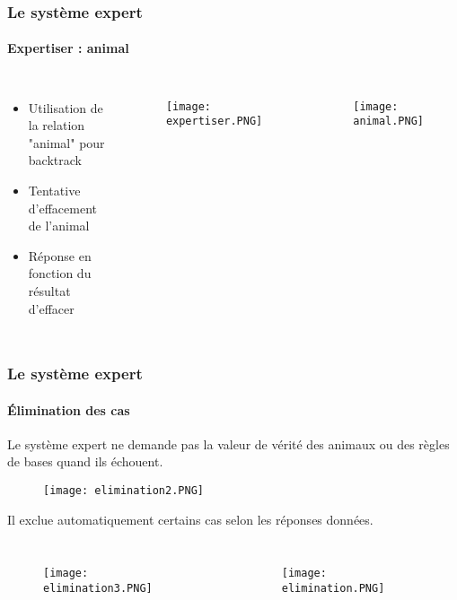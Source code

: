\documentclass[10pt]{beamer}
\begin{document}
\begin{frame}
	\frametitle{\textbf {\Large Le système expert}}
	\framesubtitle{\large Expertiser : animal}
	
	\begin{columns}
			\begin{itemize}
				\item Utilisation de la relation "animal" pour backtrack
				\smallskip
				\item Tentative d'effacement de l'animal 
				\smallskip
				\item Réponse en fonction du résultat d'effacer
			\end{itemize}
			
			\begin{figure}
				\texttt{[image: expertiser.PNG]}
 				\label{pic: Base de connaissance}
 			\end{figure}
 			\begin{figure}
				\texttt{[image: animal.PNG]}
 				\label{pic: Base de connaissance}
 			\end{figure}
	\end{columns}

\end{frame}


\begin{frame}
	\frametitle{\textbf {\Large Le système expert }}
	\framesubtitle{\large Élimination des cas}
	
	\bigskip	
	Le système expert ne demande pas la valeur de vérité des animaux ou des règles de bases quand ils échouent. 
			\begin{figure}
				\texttt{[image: elimination2.PNG]}
 				\label{pic: Base de connaissance}
 			\end{figure}
 	
 	Il exclue automatiquement certains cas selon les réponses données.
 	\begin{columns}
	
		\column{0.4\textwidth}
		\begin{figure}
				\texttt{[image: elimination3.PNG]}
 				\label{pic: Base de connaissance}
 		\end{figure}
			
		\column{0.65\textwidth}
			\begin{figure}
				\texttt{[image: elimination.PNG]}
 				\label{pic: Base de connaissance}
 			\end{figure}
	\end{columns}
 			


\end{frame}
\end{document}
